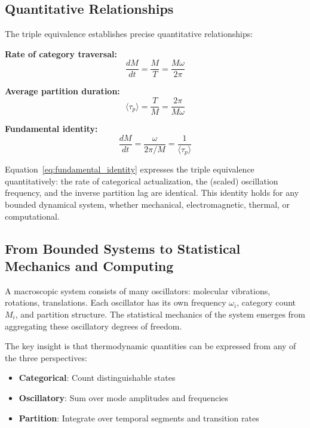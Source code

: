 \subsection{Quantitative Relationships}

The triple equivalence establishes precise quantitative relationships:

\textbf{Rate of category traversal:}
\begin{equation}
\frac{dM}{dt} = \frac{M}{T} = \frac{M\omega}{2\pi}
\end{equation}

\textbf{Average partition duration:}
\begin{equation}
\langle\tau_p\rangle = \frac{T}{M} = \frac{2\pi}{M\omega}
\end{equation}

\textbf{Fundamental identity:}
\begin{equation}
\boxed{\frac{dM}{dt} = \frac{\omega}{2\pi/M} = \frac{1}{\langle\tau_p\rangle}}
\label{eq:fundamental_identity}
\end{equation}

Equation~\eqref{eq:fundamental_identity} expresses the triple equivalence quantitatively: the rate of categorical actualization, the (scaled) oscillation frequency, and the inverse partition lag are identical. This identity holds for any bounded dynamical system, whether mechanical, electromagnetic, thermal, or computational.

\subsection{From Bounded Systems to Statistical Mechanics and Computing}

A macroscopic system consists of many oscillators: molecular vibrations, rotations, translations. Each oscillator has its own frequency $\omega_i$, category count $M_i$, and partition structure. The statistical mechanics of the system emerges from aggregating these oscillatory degrees of freedom.

The key insight is that thermodynamic quantities can be expressed from any of the three perspectives:
\begin{itemize}
\item \textbf{Categorical}: Count distinguishable states
\item \textbf{Oscillatory}: Sum over mode amplitudes and frequencies
\item \textbf{Partition}: Integrate over temporal segments and transition rates
\end{itemize}

